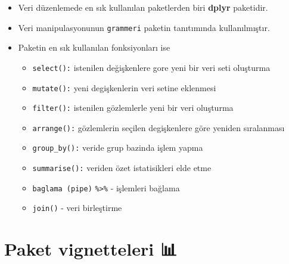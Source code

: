 \documentclass[
  oneside]{book}
\begin{document}
\begin{itemize}
\item
  Veri düzenlemede en sık kullanılan paketlerden biri \textbf{dplyr} paketidir.
\item
  Veri manipulasyonunun \texttt{grammeri} paketin tanıtımında kullanılmıştır.
\item
  Paketin en sık kullanılan fonksiyonları ise

  \begin{itemize}
  \item
    \texttt{select():} istenilen değişkenlere gore yeni bir veri seti oluşturma
  \item
    \texttt{mutate():} yeni degişkenlerin veri setine eklenmesi
  \item
    \texttt{filter():} istenilen gözlemlerle yeni bir veri oluşturma
  \item
    \texttt{arrange():} gözlemlerin seçilen degişkenlere göre yeniden sıralanması
  \item
    \texttt{group\_by():} veride grup bazinda işlem yapma
  \item
    \texttt{summarise():} veriden özet istatisikleri elde etme
  \item
    \texttt{baglama\ (pipe)} \texttt{\%\textgreater{}\%} - işlemleri bağlama
  \item
    \texttt{join()} - veri birleştirme
  \end{itemize}
\end{itemize}

\hypertarget{paket-vignetteleri}{%
\section{Paket vignetteleri 📊}\label{paket-vignetteleri}}
\end{document}
